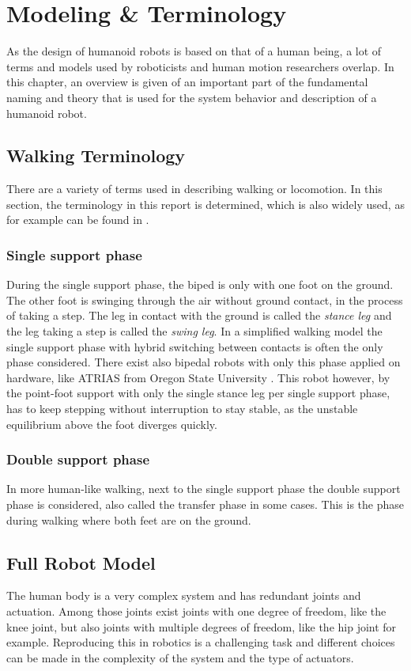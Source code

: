 %
\chapter{Modeling \& Terminology}%
\label{chap:modeling}
As the design of humanoid robots is based on that of a human being, a lot of terms and models used by roboticists and human motion researchers overlap.  In this chapter, an overview is given of an important part of the fundamental naming and theory that is used for the system behavior and description of a humanoid robot. 
\section{Walking Terminology}
There are a variety of terms used in describing walking or locomotion. In this section, the terminology in this report is determined, which is also widely used, as for example can be found in \cite{charalambous2014walking}.
\subsection{Single support phase}
During the single support phase, the biped is only with one foot on the ground. The other foot is swinging through the air without ground contact, in the process of taking a step. The leg in contact with the ground is called the \textit{stance leg} and the leg taking a step is called the \textit{swing leg}. In a simplified walking model the single support phase with hybrid switching between contacts is often the only phase considered. There exist also bipedal robots with only this phase applied on hardware, like ATRIAS from Oregon State University \cite{ramezani2014performance}. This robot however, by the point-foot support with only the single stance leg per single support phase, has to keep stepping without interruption to stay stable, as the unstable equilibrium above the foot diverges quickly. 
\subsection{Double support phase}
In more human-like walking, next to the single support phase the double support phase is considered, also called the transfer phase in some cases. This is the phase during walking where both feet are on the ground.

\section{Full Robot Model}
The human body is a very complex system and has redundant joints and actuation. Among those joints exist joints with one degree of freedom, like the knee joint, but also joints with multiple degrees of freedom, like the hip joint for example. Reproducing this in robotics is a challenging task and different choices can be made in the complexity of the system and the type of actuators. 
